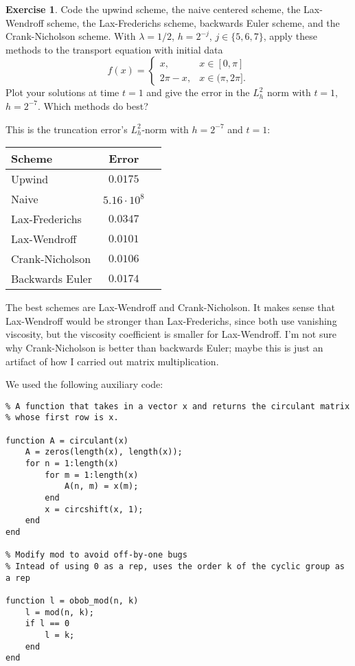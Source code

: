 \documentclass[10pt]{article}
\theoremstyle{definition}
\newtheorem{exer}{Exercise}
\begin{document}
\begin{exer}
Code the upwind scheme, the naive centered scheme, the Lax-Wendroff scheme, the Lax-Frederichs scheme, backwards Euler scheme, and the Crank-Nicholson scheme.
With $\lambda = 1/2$, $h = 2^{-j}$, $j \in \{5, 6, 7\}$, apply these methods to the transport equation with initial data
$$f(x) = \begin{cases} x, & x \in [0, \pi]\\
2\pi - x, & x \in (\pi, 2\pi].
\end{cases}$$
Plot your solutions at time $t = 1$ and give the error in the $L^2_h$ norm with $t = 1$, $h = 2^{-7}$.
Which methods do best?
\end{exer}

This is the truncation error's $L^2_h$-norm with $h = 2^{-7}$ and $t = 1$:

\begin{center}
\begin{tabular}{ l c r }
  Scheme & Error \\
  \hline
  Upwind & $0.0175$ \\
  Naive & $5.16 \cdot 10^8$ \\
  Lax-Frederichs & $0.0347$ \\
  Lax-Wendroff & $0.0101$ \\
  Crank-Nicholson & $0.0106$ \\
  Backwards Euler & $0.0174$
\end{tabular}
\end{center}

The best schemes are Lax-Wendroff and Crank-Nicholson. It makes sense that Lax-Wendroff would be stronger than Lax-Frederichs, since both use vanishing viscosity, but the viscosity coefficient is smaller for Lax-Wendroff.
I'm not sure why Crank-Nicholson is better than backwards Euler; maybe this is just an artifact of how I carried out matrix multiplication.

We used the following auxiliary code:

\begin{verbatim}
% A function that takes in a vector x and returns the circulant matrix
% whose first row is x.

function A = circulant(x)
    A = zeros(length(x), length(x));
    for n = 1:length(x)
        for m = 1:length(x)
            A(n, m) = x(m);
        end
        x = circshift(x, 1);
    end
end

% Modify mod to avoid off-by-one bugs
% Intead of using 0 as a rep, uses the order k of the cyclic group as a rep

function l = obob_mod(n, k)
    l = mod(n, k);
    if l == 0
        l = k;
    end
end
\end{verbatim}
\end{document}
